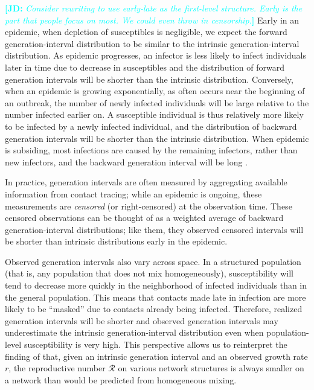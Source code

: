 \documentclass[12pt]{article}
\newcommand{\RR}{\ensuremath{{\mathcal R}}}
\newcommand{\comment}[3]{\textcolor{#1}{\textbf{[#2: }\textsl{#3}\textbf{]}}}
\newcommand{\jd}[1]{\comment{cyan}{JD}{#1}}
\begin{document}
\jd{Consider rewriting to use early-late as the first-level structure. Early is the part that people focus on most. We could even throw in censorship.}
Early in an epidemic, when depletion of susceptibles is negligible, we expect the forward generation-interval distribution to be similar to the intrinsic generation-interval distribution.
As epidemic progresses, an infector is less likely to infect individuals later in time due to decrease in susceptibles and the distribution of forward generation intervals will be shorter than the intrinsic distribution.
Conversely, when an epidemic is growing exponentially, as often occurs near the beginning of an outbreak, the number of newly infected individuals will be large relative to the number infected earlier on. 
A susceptible individual is thus relatively more likely to be infected by a newly infected individual, and the distribution of backward generation intervals will be shorter than the intrinsic distribution.
When epidemic is subsiding, most infections are caused by the remaining infectors, rather than new infectors, and the backward generation interval will be long \citep{champredon2015intrinsic}.

In practice, generation intervals are often measured by aggregating available information from contact tracing; while an epidemic is ongoing, these measurements are \emph{censored} (or right-censored) at the observation time.
These censored observations can be thought of as a weighted average of backward generation-interval distributions; like them, they observed censored intervals will be shorter than intrinsic distributions early in the epidemic.

Observed generation intervals also vary across space.
In a structured population (that is, any population that does not mix homogeneously), susceptibility will tend to decrease more quickly in the neighborhood of infected individuals than in the general population. 
This means that contacts made late in infection are more likely to be ``masked'' due to contacts already being infected.
Therefore, realized generation intervals will be shorter and observed generation intervals may underestimate the intrinsic generation-interval distribution even when population-level susceptibility is very high.
This perspective allows us to reinterpret the finding of \cite{trapman2016inferring} that, given an intrinsic generation interval and an observed growth rate $r$, the reproductive number $\RR$ on various network structures is always smaller on a network than would be predicted from homogeneous mixing.
\end{document}
